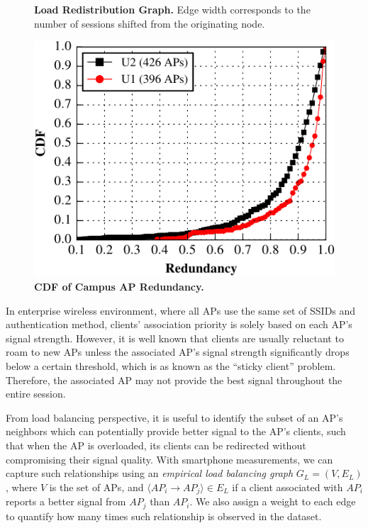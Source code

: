 \begin{figure}
\begin{minipage}[t]{0.31\textwidth}
    \caption{\textbf{Load Redistribution Graph.} Edge width corresponds to the
    number of \wifi{} sessions shifted from the originating node.}
    \label{fig:davis_load_redist}
  \end{minipage}\hspace{0.02\textwidth}%
  \begin{minipage}[t]{0.31\textwidth}
    \includegraphics[width=\textwidth]{./figures/CampusAPRedundancyFigure.pdf}
    \caption{\textbf{CDF of Campus AP Redundancy.}}
    \label{fig:ap_redundancy}
  \end{minipage}
  \vspace*{\aftercaptiongap}
\end{figure}

In enterprise wireless environment, where all APs use the same set of SSIDs and
authentication method, clients' association priority is solely based on each
AP's signal strength. However, it is well known that \wifi{} clients are usually
reluctant to roam to new APs unless the associated AP's signal strength
significantly drops below a certain threshold, which is as known as the ``sticky
client'' problem. Therefore, the associated AP may not provide the
best signal throughout the entire \wifi{} session.

From load balancing perspective, it is useful to identify the subset of an AP's
neighbors which can potentially provide better signal to the AP's clients, such
that when the AP is overloaded, its clients can be redirected without
compromising their signal quality. With smartphone measurements, we can capture
such relationships using an \textit{empirical load balancing graph} $G_L = (V,
E_L)$, where $V$ is the set of APs, and $\langle AP_i \rightarrow AP_j \rangle
\in E_L$ if a client associated with $AP_i$ reports a better signal from $AP_j$
than $AP_i$. We also assign a weight to each edge to quantify how many times
such relationship is observed in the dataset.


